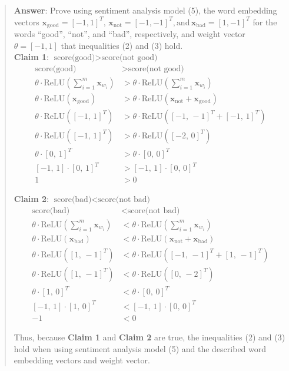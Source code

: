 \begin{quote}
{\bf Answer}: Prove using sentiment analysis model (5), the word embedding vectors $\textbf{x}_{\textrm{good}} = [-1, 1]^T, \, \textbf{x}_{\textrm{not}} = [-1, -1]^T, \textrm{and}\, \textbf{x}_{\textrm{bad}} = [1, -1]^T$  for the words ``good'', ``not'', and ``bad'', respectively, and weight vector $\mathbb{\theta} = [-1, 1]$ that inequalities (2) and (3) hold. \\

{\bf Claim 1}: $\textrm{score(good)} > \textrm{score(not good)}$
    \begin{align*}
	\textrm{score(good)} &> \textrm{score(not good)} \\
	\mathbb{\theta} \cdot \textrm{ReLU} \left( \sum_{i=1}^{m} \textbf{x}_{w_i} \right) &> \mathbb{\theta} \cdot \textrm{ReLU} \left( \sum_{i=1}^{m} \textbf{x}_{w_i} \right) \\
	\mathbb{\theta} \cdot \textrm{ReLU} \left( \textbf{x}_{\textrm{good}} \right) &> \mathbb{\theta} \cdot \textrm{ReLU} \left( \textbf{x}_{\textrm{not}} + \textbf{x}_{\textrm{good}} \right) \\
	\mathbb{\theta} \cdot \textrm{ReLU} \left( [-1, \, 1]^T \right) &> \mathbb{\theta} \cdot \textrm{ReLU} \left( [-1, \, -1]^T + [-1,\, 1]^T \right) \\
	\mathbb{\theta} \cdot \textrm{ReLU} \left( [-1, \, 1]^T \right) &> \mathbb{\theta} \cdot \textrm{ReLU} \left( [-2, \, 0]^T \right) \\
	\mathbb{\theta} \cdot [0, \, 1]^T &> \mathbb{\theta} \cdot [0, \, 0]^T  \\
	[-1, \, 1] \cdot [0, \, 1]^T &> [-1, \, 1] \cdot [0, \, 0]^T \\
	1 &> 0
    \end{align*}

{\bf Claim 2}: $\textrm{score(bad)} < \textrm{score(not bad)}$
    \begin{align*}
	\textrm{score(bad)} &< \textrm{score(not bad)} \\
	\mathbb{\theta} \cdot \textrm{ReLU} \left( \sum_{i=1}^{m} \textbf{x}_{w_i} \right) &< \mathbb{\theta} \cdot \textrm{ReLU} \left( \sum_{i=1}^{m} \textbf{x}_{w_i} \right) \\
	\mathbb{\theta} \cdot \textrm{ReLU} \left( \textbf{x}_{\textrm{bad}} \right) &< \mathbb{\theta} \cdot \textrm{ReLU} \left( \textbf{x}_{\textrm{not}} + \textbf{x}_{\textrm{bad}} \right) \\
	\mathbb{\theta} \cdot \textrm{ReLU} \left( [1, \, -1]^T \right) &< \mathbb{\theta} \cdot \textrm{ReLU} \left( [-1, \, -1]^T + [1,\, -1]^T \right) \\
	\mathbb{\theta} \cdot \textrm{ReLU} \left( [1, \, -1]^T \right) &< \mathbb{\theta} \cdot \textrm{ReLU} \left( [0, \, -2]^T \right) \\
	\mathbb{\theta} \cdot [1, \, 0]^T &< \mathbb{\theta} \cdot [0, \, 0]^T  \\
	[-1, \, 1] \cdot [1, \, 0]^T &< [-1, \, 1] \cdot [0, \, 0]^T \\
	-1 &< 0
    \end{align*}

Thus, because {\bf Claim 1} and {\bf Claim 2} are true, the inequalities (2) and (3) hold when using sentiment analysis model (5) and the described word embedding vectors and weight vector.
\end{quote}
